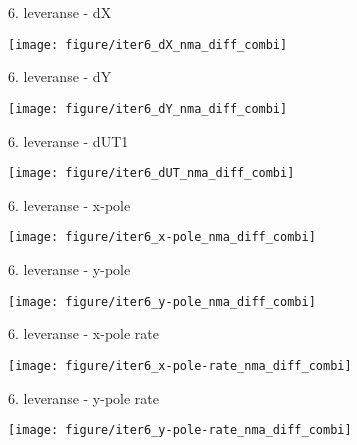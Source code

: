 \documentclass[14pt,c]{beamer}
\begin{document}
\begin{frame}{6. leveranse - dX}
\begin{centering}
    \hfill\texttt{[image: figure/iter6\_dX\_nma\_diff\_combi]}\hspace*{\fill}
\end{centering}
\end{frame}

\begin{frame}{6. leveranse - dY}
\begin{centering}
    \hfill\texttt{[image: figure/iter6\_dY\_nma\_diff\_combi]}\hspace*{\fill}
\end{centering}
\end{frame}

\begin{frame}{6. leveranse - dUT1}
\begin{centering}
    \hfill\texttt{[image: figure/iter6\_dUT\_nma\_diff\_combi]}\hspace*{\fill}
\end{centering}
\end{frame}

\begin{frame}{6. leveranse - x-pole}
\begin{centering}
    \hfill\texttt{[image: figure/iter6\_x-pole\_nma\_diff\_combi]}\hspace*{\fill}
\end{centering}
\end{frame}

\begin{frame}{6. leveranse - y-pole}
\begin{centering}
    \hfill\texttt{[image: figure/iter6\_y-pole\_nma\_diff\_combi]}\hspace*{\fill}
\end{centering}
\end{frame}

\begin{frame}{6. leveranse - x-pole rate}
\begin{centering}
    \hfill\texttt{[image: figure/iter6\_x-pole-rate\_nma\_diff\_combi]}\hspace*{\fill}
\end{centering}
\end{frame}

\begin{frame}{6. leveranse - y-pole rate}
\begin{centering}
    \hfill\texttt{[image: figure/iter6\_y-pole-rate\_nma\_diff\_combi]}\hspace*{\fill}
\end{centering}
\end{frame}
\end{document}
